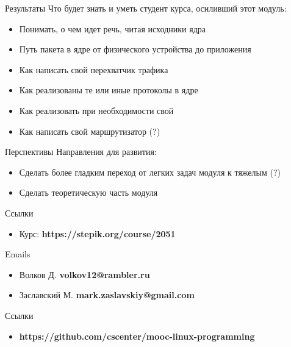 \documentclass{beamer}
\begin{document}
\begin{frame}{Результаты}
        Что будет знать и уметь студент курса, осиливший этот модуль:
	\begin{itemize}
		\item Понимать, о чем идет речь, читая исходники ядра
		\item Путь пакета в ядре от физического устройства до приложения
		\item Как написать свой перехватчик трафика
		\item Как реализованы те или иные протоколы в ядре
		\item Как реализовать при необходимости свой
                \item Как написать свой маршрутизатор (?)
	\end{itemize}
\end{frame}

\begin{frame}{Перспективы}
	Направления для развития:
	\begin{itemize}
                \item Сделать более гладким переход от легких задач модуля к тяжелым (?)
                \item Сделать теоретическую часть модуля
	\end{itemize}
\end{frame}

\begin{frame}{Ссылки}
	\begin{itemize}
		\item Курс: \textbf{https://stepik.org/course/2051}
	\end{itemize}
\end{frame}

\begin{frame}{Emails}
	\begin{itemize}
		\item Волков Д. \textbf{volkov12@rambler.ru}
		\item Заславский М. \textbf{mark.zaslavskiy@gmail.com}
	\end{itemize}
\end{frame}

\begin{frame}{Ссылки}
	\begin{itemize}
		\item \textbf{https://github.com/cscenter/mooc-linux-programming}
	\end{itemize}
\end{frame}
\end{document}
